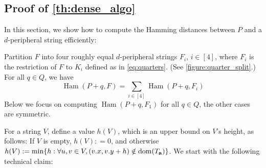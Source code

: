 \documentclass[11pt, letterpaper]{article}
\theoremstyle{plain}
\theoremstyle{definition}
\theoremstyle{remark}
\DeclareMathOperator*{\Ham}{Ham}
\begin{document}
\subsection{Proof of \cref{th:dense_algo}}
In this section, we show how to compute the Hamming distances between $P$ and a $d$-peripheral string efficiently:

\DenseAlgo

Partition $F$ into four roughly equal $d$-peripheral strings $F_i$, $i \in [4]$, where $F_i$ is the restriction of $F$ to $K_i$ defined as in \cref{eq:quarters}. (See \cref{figure:quarter_split}.) For all $q \in Q$, we have 
%
$$\Ham(P + q, F) = \sum_{i \in [4]} \Ham(P + q, F_i)$$
%
Below we focus on computing $\Ham(P + q, F_1)$ for all $q \in Q$, the other cases are symmetric. 

For a string $V$, define a value $h(V)$, which is an upper bound on $V$'s height, as follows: If $V$ is empty, $h(V): = 0$, and otherwise $h(V) := \min \{h : \forall u,v \in V, (v.x, v.y + h) \notin \operatorname*{dom}(T_\mathbf{a})\}$. We start with the following technical claim:
\end{document}
